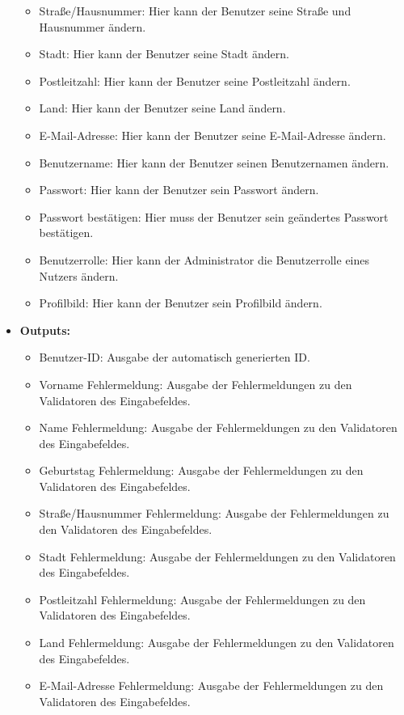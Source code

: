 \begin{itemize}
\begin{itemize}
								\item Straße/Hausnummer: Hier kann der Benutzer seine Straße und Hausnummer ändern.
								\item Stadt: Hier kann der Benutzer seine Stadt ändern.
								\item Postleitzahl: Hier kann der Benutzer seine Postleitzahl ändern.
								\item Land: Hier kann der Benutzer seine Land ändern.
								\item E-Mail-Adresse: Hier kann der Benutzer seine E-Mail-Adresse ändern.
								\item Benutzername: Hier kann der Benutzer seinen Benutzernamen ändern.
								\item Passwort: Hier kann der Benutzer sein Passwort ändern.
								\item Passwort bestätigen: Hier muss der Benutzer sein geändertes Passwort bestätigen.
								\item Benutzerrolle: Hier kann der Administrator die Benutzerrolle eines Nutzers ändern.
								\item Profilbild: Hier kann der Benutzer sein Profilbild ändern.
							\end{itemize}
						\item \textbf{Outputs:}
							\begin{itemize}
								\item Benutzer-ID: Ausgabe der automatisch generierten ID.
								\item Vorname Fehlermeldung: Ausgabe der Fehlermeldungen zu den Validatoren des Eingabefeldes.
								\item Name Fehlermeldung: Ausgabe der Fehlermeldungen zu den Validatoren des Eingabefeldes.
								\item Geburtstag Fehlermeldung: Ausgabe der Fehlermeldungen zu den Validatoren des Eingabefeldes.
								\item Straße/Hausnummer Fehlermeldung: Ausgabe der Fehlermeldungen zu den Validatoren des Eingabefeldes.
								\item Stadt Fehlermeldung: Ausgabe der Fehlermeldungen zu den Validatoren des Eingabefeldes.
								\item Postleitzahl Fehlermeldung: Ausgabe der Fehlermeldungen zu den Validatoren des Eingabefeldes.
								\item Land Fehlermeldung: Ausgabe der Fehlermeldungen zu den Validatoren des Eingabefeldes.
								\item E-Mail-Adresse Fehlermeldung: Ausgabe der Fehlermeldungen zu den Validatoren des Eingabefeldes.

\end{itemize}
\end{itemize}
